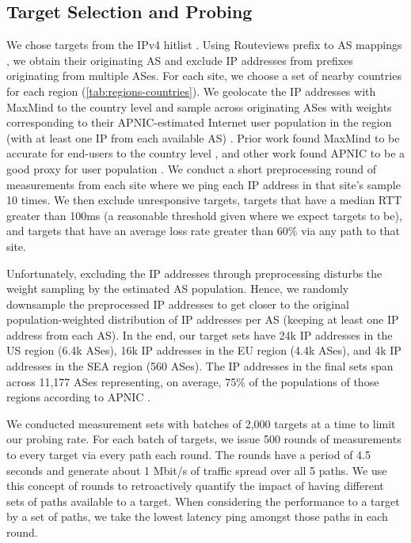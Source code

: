 \documentclass[sigconf,nonacm,screen,letterpaper,10pt]{acmart}
\begin{document}
\hypertarget{target-selection-and-probing}{%
\subsection{Target Selection and
Probing}\label{target-selection-and-probing}}

We chose targets from the IPv4 hitlist \cite{ant_ip_hitlist}. Using
Routeviews prefix to AS mappings \cite{routeviews}, we obtain their
originating AS and exclude IP addresses from prefixes originating from
multiple ASes. For each site, we choose a set of nearby countries for
each region (\cref{tab:regions-countries}). We geolocate the IP
addresses with MaxMind to the country level \cite{maxmind} and sample
across originating ASes with weights corresponding to their
APNIC-estimated Internet user population in the region (with at least
one IP from each available AS) \cite{apnic_pop_est}. Prior work found
MaxMind to be accurate for end-users to the country level
\cite{maxmind}, and other work found APNIC to be a good proxy for user
population \cite{loqman-apnic}. We conduct a short preprocessing round
of measurements from each site where we ping each IP address in that
site's sample 10 times. We then exclude unresponsive targets, targets
that have a median RTT greater than 100ms (a reasonable threshold given
where we expect targets to be), and targets that have an average loss
rate greater than 60\% via any path to that site.

Unfortunately, excluding the IP addresses through preprocessing disturbs
the weight sampling by the estimated AS population. Hence, we randomly
downsample the preprocessed IP addresses to get closer to the original
population-weighted distribution of IP addresses per AS (keeping at
least one IP address from each AS). In the end, our target sets have 24k
IP addresses in the US region (6.4k ASes), 16k IP addresses in the EU
region (4.4k ASes), and 4k IP addresses in the SEA region (560 ASes).
The IP addresses in the final sets span across 11,177 ASes representing,
on average, 75\% of the populations of those regions according to APNIC
\cite{apnic_pop_est}.

We conducted measurement sets with batches of 2,000 targets at a time to
limit our probing rate. For each batch of targets, we issue 500 rounds
of measurements to every target via every path each round. The rounds
have a period of 4.5 seconds and generate about 1 Mbit/s of traffic
spread over all 5 paths. We use this concept of rounds to retroactively
quantify the impact of having different sets of paths available to a
target. When considering the performance to a target by a set of paths,
we take the lowest latency ping amongst those paths in each round.
\end{document}
